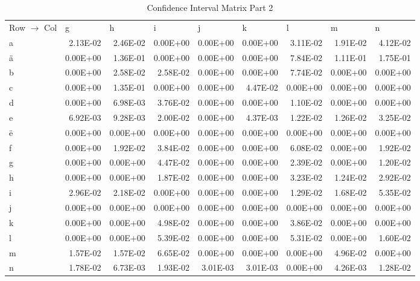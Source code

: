 \documentclass[11pt,a4paper]{CLabBookTemplate} %
\begin{document}
\begin{table}[htbp]
	\centering
	\caption{Confidence Interval Matrix Part 2}
	\begin{tabular}{lrrrrrrrr}
		Row $\rightarrow$ Col & \multicolumn{1}{l}{g} & \multicolumn{1}{l}{h} & \multicolumn{1}{l}{i} & \multicolumn{1}{l}{j} & \multicolumn{1}{l}{k} & \multicolumn{1}{l}{l} & \multicolumn{1}{l}{m} & \multicolumn{1}{l}{n} \\
		a     & 2.13E-02 & 2.46E-02 & 0.00E+00 & 0.00E+00 & 0.00E+00 & 3.11E-02 & 1.91E-02 & 4.12E-02 \\
		ä     & 0.00E+00 & 1.36E-01 & 0.00E+00 & 0.00E+00 & 0.00E+00 & 7.84E-02 & 1.11E-01 & 1.75E-01 \\
		b     & 0.00E+00 & 2.58E-02 & 2.58E-02 & 0.00E+00 & 0.00E+00 & 7.74E-02 & 0.00E+00 & 0.00E+00 \\
		c     & 0.00E+00 & 1.35E-01 & 0.00E+00 & 0.00E+00 & 4.47E-02 & 0.00E+00 & 0.00E+00 & 0.00E+00 \\
		d     & 0.00E+00 & 6.98E-03 & 3.76E-02 & 0.00E+00 & 0.00E+00 & 1.10E-02 & 0.00E+00 & 0.00E+00 \\
		e     & 6.92E-03 & 9.28E-03 & 2.00E-02 & 0.00E+00 & 4.37E-03 & 1.22E-02 & 1.26E-02 & 3.25E-02 \\
		ë     & 0.00E+00 & 0.00E+00 & 0.00E+00 & 0.00E+00 & 0.00E+00 & 0.00E+00 & 0.00E+00 & 0.00E+00 \\
		f     & 0.00E+00 & 1.92E-02 & 3.84E-02 & 0.00E+00 & 0.00E+00 & 6.08E-02 & 0.00E+00 & 1.92E-02 \\
		g     & 0.00E+00 & 0.00E+00 & 4.47E-02 & 0.00E+00 & 0.00E+00 & 2.39E-02 & 0.00E+00 & 1.20E-02 \\
		h     & 0.00E+00 & 0.00E+00 & 1.87E-02 & 0.00E+00 & 0.00E+00 & 3.23E-02 & 1.24E-02 & 2.92E-02 \\
		i     & 2.96E-02 & 2.18E-02 & 0.00E+00 & 0.00E+00 & 0.00E+00 & 1.29E-02 & 1.68E-02 & 5.35E-02 \\
		j     & 0.00E+00 & 0.00E+00 & 0.00E+00 & 0.00E+00 & 0.00E+00 & 0.00E+00 & 0.00E+00 & 0.00E+00 \\
		k     & 0.00E+00 & 0.00E+00 & 4.98E-02 & 0.00E+00 & 0.00E+00 & 3.86E-02 & 0.00E+00 & 0.00E+00 \\
		l     & 0.00E+00 & 0.00E+00 & 5.39E-02 & 0.00E+00 & 0.00E+00 & 5.31E-02 & 0.00E+00 & 1.60E-02 \\
		m     & 1.57E-02 & 1.57E-02 & 6.65E-02 & 0.00E+00 & 0.00E+00 & 0.00E+00 & 4.96E-02 & 0.00E+00 \\
		n     & 1.78E-02 & 6.73E-03 & 1.93E-02 & 3.01E-03 & 3.01E-03 & 0.00E+00 & 4.26E-03 & 1.28E-02 \\

\end{tabular}
\end{table}
\end{document}
